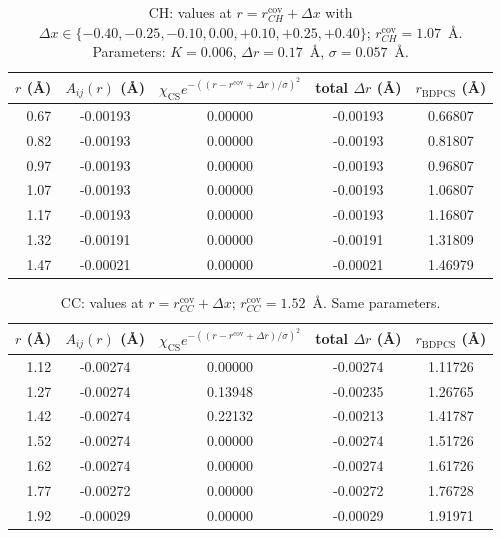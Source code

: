 \documentclass[a4paper]{article}
\begin{document}
\medskip


\begin{table}[h]
\centering
\caption{CH: values at $r=r^{\mathrm{cov}}_{CH}+\Delta x$ with $\Delta x\in\{-0.40,-0.25,-0.10,0.00,+0.10,+0.25,+0.40\}$; $r^{\mathrm{cov}}_{CH}=1.07$~\AA. Parameters: $K=0.006$, $\Delta r=0.17$~\AA, $\sigma=0.057$~\AA.}
\begin{tabular}{rcccc}
\hline
$r$ (\AA) & $A_{ij}(r)$ (\AA) & $\chi_{\mathrm{CS}}e^{-((r-r^{\mathrm{cov}}+\Delta r)/\sigma)^2}$ & total $\Delta r$ (\AA) & $r_{\mathrm{BDPCS}}$ (\AA) \\
\hline
0.67 & -0.00193 & 0.00000 & -0.00193 & 0.66807 \\
0.82 & -0.00193 & 0.00000 & -0.00193 & 0.81807 \\
0.97 & -0.00193 & 0.00000 & -0.00193 & 0.96807 \\
1.07 & -0.00193 & 0.00000 & -0.00193 & 1.06807 \\
1.17 & -0.00193 & 0.00000 & -0.00193 & 1.16807 \\
1.32 & -0.00191 & 0.00000 & -0.00191 & 1.31809 \\
1.47 & -0.00021 & 0.00000 & -0.00021 & 1.46979 \\
\hline
\end{tabular}
\end{table}

\begin{table}[h]
\centering
\caption{CC: values at $r=r^{\mathrm{cov}}_{CC}+\Delta x$; $r^{\mathrm{cov}}_{CC}=1.52$~\AA. Same parameters.}
\begin{tabular}{rcccc}
\hline
$r$ (\AA) & $A_{ij}(r)$ (\AA) & $\chi_{\mathrm{CS}}e^{-((r-r^{\mathrm{cov}}+\Delta r)/\sigma)^2}$ & total $\Delta r$ (\AA) & $r_{\mathrm{BDPCS}}$ (\AA) \\
\hline
1.12 & -0.00274 & 0.00000 & -0.00274 & 1.11726 \\
1.27 & -0.00274 & 0.13948 & -0.00235 & 1.26765 \\
1.42 & -0.00274 & 0.22132 & -0.00213 & 1.41787 \\
1.52 & -0.00274 & 0.00000 & -0.00274 & 1.51726 \\
1.62 & -0.00274 & 0.00000 & -0.00274 & 1.61726 \\
1.77 & -0.00272 & 0.00000 & -0.00272 & 1.76728 \\
1.92 & -0.00029 & 0.00000 & -0.00029 & 1.91971 \\
\hline
\end{tabular}
\end{table}
\end{document}
